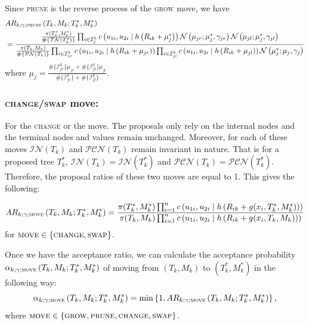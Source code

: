 \documentclass[
12pt]{article}
\begin{document}
Since \textsc{prune} is the reverse process of the \textsc{grow} move, we have
\begin{align*}
	&AR_{k;\gamma;\textsc{prune}}\left(T_k,M_k;T_k^{\ast}, M_k^{\ast}\right)\\
	&= \frac{
		\frac{\pi(T^{\ast}_k,M^{\ast}_k)}{\#\{\mathcal{TN}(T^{\ast}_k)\}} 
		\prod_{i\in \mathcal{I}_{j}^k}c\left(u_{1i},u_{2i}\mid h\left(R_{ik}+\mu^{\ast}_j\right)\right) 
		\mathcal{N}\left(\mu_{jr};\mu^{\ast}_{j},\gamma_{jr}\right)
		\mathcal{N}\left(\mu_{jl};\mu^{\ast}_{j},\gamma_{jl}\right)}
	{\frac{\pi(T_k,M_k)}{\#\{\mathcal{PN}(T_k)\}} 
		\prod_{i\in \mathcal{I}_{jr}^k}c\left(u_{1i},u_{2i}\mid h\left(R_{ik}+\mu_{jr}\right)\right)
		\prod_{i\in \mathcal{I}_{jl}^k}c\left(u_{1i},u_{2i}\mid h\left(R_{ik}+\mu_{jl}\right)\right)
		\mathcal{N}\left(\mu^{\ast}_j;\mu_{j},\gamma_j\right)}
\end{align*}
where $\mu_j = \frac{\#\{\mathcal{I}^k_{jr}\}\mu_{jr} + \#\{\mathcal{I}^k_{jl}\}\mu_{jl}}{\#\{\mathcal{I}^k_{jr}\} + \#\{\mathcal{I}^k_{jl}\}}$.

\subsubsection{\textsc{change}/\textsc{swap} move:}
For the \textsc{change} or the  move. The proposals only rely on the internal nodes and the terminal nodes and values remain unchanged. Moreover, for each of these moves $\mathcal{IN}(T_k)$ and $\mathcal{PCN}(T_k)$ remain invariant in nature. That is for a proposed tree $T_k^{\ast}$, $\mathcal{IN}(T_k)=\mathcal{IN}(T_k^{\ast})$ and $\mathcal{PCN}(T_k)=\mathcal{PCN}(T_k^{\ast})$. Therefore, the proposal ratios of these two moves are equal to 1. This gives the following:

\begin{align*}
	AR_{k;\gamma;\textsc{move}}\left(T_k,M_k;T_k^{\ast}, M_k^{\ast}\right)= \frac{
		\pi(T^{\ast}_k,M^{\ast}_k) 
		\prod_{i=1}^{n}c\left(u_{1i},u_{2i}\mid h\left(R_{ik}+g(x_i, T_k^{\ast}, M_k^{\ast})\right)\right)}
	{\pi(T_k,M_k) 
		\prod_{i=1}^{n}c\left(u_{1i},u_{2i}\mid h\left(R_{ik}+g(x_i, T_k, M_k)\right)\right)}
\end{align*}
for $\textsc{move}\in\{\textsc{change},\textsc{swap}\}$.

Once we have the acceptance ratio, we can calculate the acceptance probability $\alpha_{k;\gamma;\textsc{move}}\left(T_k,M_k;T_k^{\ast}, M_k^{\ast}\right)$ of moving from $(T_k,M_k)$ to $(T_k^{\ast},M_k^{\ast})$ in the following way:
\begin{equation*}
	\alpha_{k;\gamma;\textsc{move}}\left(T_k,M_k;T_k^{\ast}, M_k^{\ast}\right) = \min\left\{1,AR_{k;\gamma;\textsc{move}}\left(T_k,M_k;T_k^{\ast}, M_k^{\ast}\right)\right\},
\end{equation*}
where $\textsc{move}\in \left\{\textsc{grow}, \textsc{prune}, \textsc{change}, \textsc{swap}\right\}$.
\end{document}
